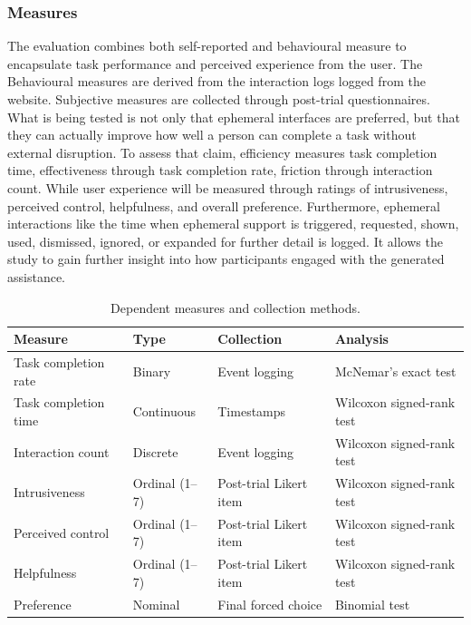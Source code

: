 \subsubsection{Measures}
The evaluation combines both self-reported and behavioural measure to encapsulate task performance and perceived experience from the user. The Behavioural measures are derived from the interaction logs logged from the website. Subjective measures are collected through post-trial questionnaires. What is being tested is not only that ephemeral interfaces are preferred, but that they can actually improve how well a person can complete a task without external disruption. To assess that claim, efficiency measures task completion time, effectiveness through task completion rate, friction through interaction count. While user experience will be measured through ratings of intrusiveness, perceived control, helpfulness, and overall preference. Furthermore, ephemeral interactions like the time when ephemeral support is triggered, requested, shown, used, dismissed, ignored, or expanded for further detail is logged. It allows the study to gain further insight into how participants engaged with the generated assistance.

\begin{table}[htbp]
    \centering
    \caption{Dependent measures and collection methods.}
    \label{tab:measures}
    \begin{tabular}{@{}llll@{}}
        \toprule
        Measure & Type & Collection & Analysis \\
        \midrule
        Task completion rate & Binary & Event logging & McNemar's exact test \\
        Task completion time & Continuous & Timestamps & Wilcoxon signed-rank test \\
        Interaction count & Discrete & Event logging & Wilcoxon signed-rank test \\
        Intrusiveness & Ordinal (1--7) & Post-trial Likert item & Wilcoxon signed-rank test \\
        Perceived control & Ordinal (1--7) & Post-trial Likert item & Wilcoxon signed-rank test \\
        Helpfulness & Ordinal (1--7) & Post-trial Likert item & Wilcoxon signed-rank test \\
        Preference & Nominal & Final forced choice & Binomial test \\
        \bottomrule
    \end{tabular}
\end{table}


